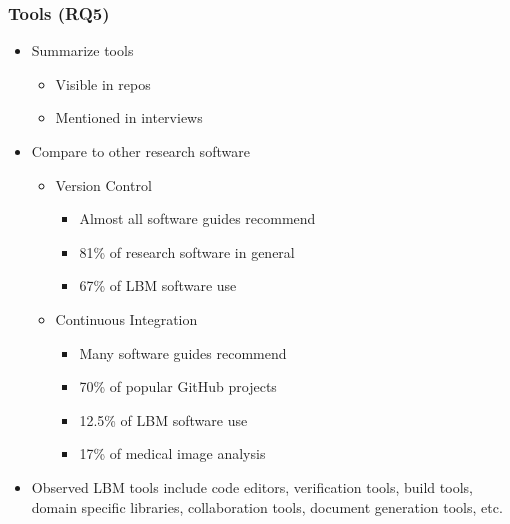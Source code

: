 \documentclass[usenames,dvipsnames]{beamer}
\begin{document}
\hoffset=0in %


\begin{frame}

\frametitle{Tools (RQ5)}

\begin{itemize}
  \item Summarize tools
  \begin{itemize}
    \item Visible in repos
    \item Mentioned in interviews
  \end{itemize}
  \item Compare to other research software
  \begin{itemize}
    \item Version Control
    \begin{itemize}
      \item Almost all software guides recommend
      \item 81\% of research software in general \citep{AlNoamanyAndBorghi2018}
      \item 67\% of LBM software use
    \end{itemize}
    \item Continuous Integration
    \begin{itemize}
      \item Many software guides recommend
      \item 70\% of popular GitHub projects \citep{HiltonEtAl2016}
      \item 12.5\% of LBM software use
      \item 17\% of medical image analysis
    \end{itemize}
  \end{itemize}
  \item Observed LBM tools include code editors, verification tools, build
  tools, domain specific libraries, collaboration tools, document generation
  tools, etc.
\end{itemize}

\end{frame}
  
\end{document}
